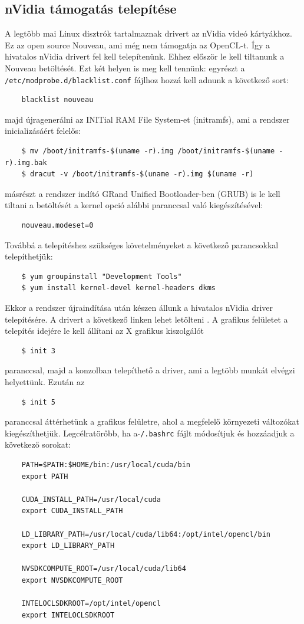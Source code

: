 \subsection{nVidia támogatás telepítése}
	A legtöbb mai Linux disztrók tartalmaznak drivert az nVidia videó kártyákhoz.
	Ez az open source Nouveau, ami még nem támogatja az OpenCL-t.
	Így a hivatalos nVidia drivert fel kell telepítenünk.
	Ehhez először le kell tiltanunk a Nouveau betöltését.
	Ezt két helyen is meg kell tennünk: 
	egyrészt a \texttt{/etc/modprobe.d/blacklist.conf} fájlhoz hozzá kell adnunk a
	következő sort:
	\begin{lstlisting}
	blacklist nouveau
	\end{lstlisting}
	majd újragenerálni az INITial RAM File System-et (initramfs), ami a rendszer
	inicializásáért felelős:
	\begin{lstlisting}
	$ mv /boot/initramfs-$(uname -r).img /boot/initramfs-$(uname -r).img.bak
	$ dracut -v /boot/initramfs-$(uname -r).img $(uname -r)
	\end{lstlisting}
	másrészt a rendszer indító GRand Unified Bootloader-ben (GRUB) is le kell
	tiltani a betöltését a kernel opció alábbi paranccsal való kiegészítésével:
	\begin{lstlisting}
	nouveau.modeset=0
	\end{lstlisting}
	Továbbá a telepítéshez szükséges követelményeket a következő parancsokkal telepíthetjük:
	\begin{lstlisting}
	$ yum groupinstall "Development Tools"
	$ yum install kernel-devel kernel-headers dkms
	\end{lstlisting}
	Ekkor a rendszer újraindítása után készen állunk a hivatalos nVidia driver
	telepítésére. A drivert a következő linken lehet letölteni \cite{nvidia-driver}.
	A grafikus felületet a telepítés idejére le kell állítani az X grafikus
	kiszolgálót
	\begin{lstlisting}
	$ init 3
	\end{lstlisting}
	paranccsal, majd a konzolban telepíthető a driver, ami a legtöbb munkát elvégzi helyettünk. Ezután az
	\begin{lstlisting}
	$ init 5
	\end{lstlisting}
	paranccsal áttérhetünk a grafikus felületre, ahol a megfelelő környezeti változókat kiegészíthetjük.
	Legcélratörőbb, ha a \texttt{$\tilde{}$/.bashrc} fájlt módosítjuk és hozzáadjuk
	a következő sorokat:
	\begin{lstlisting}
	PATH=$PATH:$HOME/bin:/usr/local/cuda/bin
	export PATH
	
	CUDA_INSTALL_PATH=/usr/local/cuda
	export CUDA_INSTALL_PATH
	
	LD_LIBRARY_PATH=/usr/local/cuda/lib64:/opt/intel/opencl/bin
	export LD_LIBRARY_PATH
	
	NVSDKCOMPUTE_ROOT=/usr/local/cuda/lib64
	export NVSDKCOMPUTE_ROOT
	
	INTELOCLSDKROOT=/opt/intel/opencl
	export INTELOCLSDKROOT
	\end{lstlisting}
